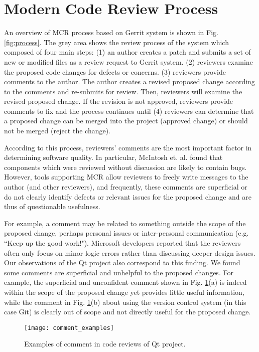 

\section{Modern Code Review Process}

An overview of MCR process based on Gerrit system is shown in Fig. \ref{fig:process}.
The grey area shows the review process of the system which composed of four main steps:
(1) an author creates a patch and submits a set of new or modified files as a review request to Gerrit system.
(2) reviewers examine the proposed code changes for defects or concerns.
(3) reviewers provide comments to the author. The author creates a revised proposed change according to the comments and re-submits for review. Then, reviewers will examine the revised proposed change. If the revision is not approved, reviewers provide comments to fix and the process continues until (4) reviewers can determine that a proposed change can be merged into the project (approved change) or should not be merged (reject the change). 


According to this process, reviewers' comments are the most important factor in determining software quality.
In particular, McIntosh et. al. \cite{Mcintosh} found that components which were reviewed without discussion are likely to contain bugs.
However, tools supporting MCR allow reviewers to freely write messages to the author (and other reviewers), and frequently, these comments are superficial or do not clearly identify defects or relevant issues for the proposed change and are thus of questionable usefulness.


For example, a comment may be related to something outside the scope of the proposed change, perhaps personal issues or inter-personal communication (e.g. ``Keep up the good work!").
Microsoft developers reported that the reviewers often only focus on minor logic errors rather than discussing deeper design\cite{Bacchelli2013a} issues.
Our observations of the Qt project also correspond to this finding.
We found some comments are superficial and unhelpful to the proposed changes.
For example, the superficial and unconfident comment shown in Fig. \ref{fig:example}(a) is indeed within the scope of the proposed change yet provides little useful information,
while the comment in Fig. \ref{fig:example}(b) about using the version control system (in this case Git) is clearly out of scope and not directly useful for the proposed change. 



\begin{figure}[!t]
\centering
\texttt{[image: comment\_examples]}
\caption{Examples of comment in code reviews of Qt project.}
\label{fig:example}
\end{figure}

